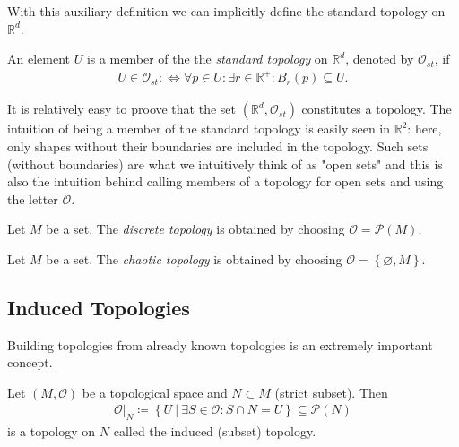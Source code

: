 With this auxiliary definition we can implicitly define the standard topology on \(\mathbb{R} ^d\). 

\begin{definition}
    An element \(U\) is a member of the the \textit{standard topology} on \(\mathbb{R} ^d\), denoted by \(\mathcal{O}_{st}\), if \begin{align*}
        U \in \mathcal{O}_{st} :\iff  \forall p \in U : \exists r \in \mathbb{R}^+ : B_r(p) \subseteq U.
    \end{align*}
\end{definition}
It is relatively easy to proove that the set \((\mathbb{R} ^d, \mathcal{O}_{st})\) constitutes a topology. The intuition of being a member of the standard topology is easily seen in \(\mathbb{R}^2\): here, only shapes without their boundaries are included in the topology. Such sets (without boundaries) are what we intuitively think of as "open sets" and this is also the intuition behind calling members of a topology for open sets and using the letter \(\mathcal{O}\).

\begin{definition}
    Let \(M\) be a set. The \textit{discrete topology} is obtained by choosing \(\mathcal{O} = \mathcal{P} (M)\). 
\end{definition}
\begin{definition}
    Let \(M\) be a set. The \textit{chaotic topology} is obtained by choosing \(\mathcal{O} = \left\{ \varnothing , M \right\} \).
\end{definition}

\subsection{Induced Topologies}
Building topologies from already known topologies is an extremely important concept. 

\begin{proposition}
    Let \((M, \mathcal{O})\) be a topological space and \(N \subset M\) (strict subset). Then \begin{align*}
        \mathcal{O}\bigr|_{N} \coloneqq \left\{ U\ \big|\ \exists S \in \mathcal{O} : S \cap N = U \right\} \subseteq \mathcal{P} (N)
    \end{align*} 
    is a topology on \(N\) called the {\normalfont induced (subset) topology}.
\end{proposition}

